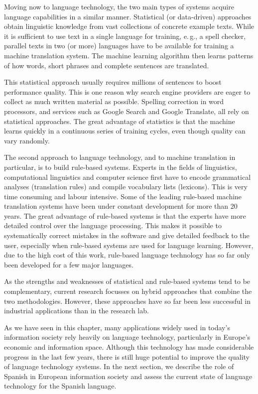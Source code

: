 \begin{multicols}{2}
Moving now to language technology, the two main types of systems acquire language capabilities in a similar manner. Statistical (or data-driven) approaches obtain linguistic knowledge from vast collections of concrete example texts. While it is sufficient to use text in a single language for training, e.\,g., a spell checker, parallel texts in two (or more) languages have to be available for training a machine translation system. The machine learning algorithm then learns patterns of how words, short phrases and complete sentences are translated. 

This statistical approach usually requires millions of sentences to boost performance quality. This is one reason why search engine providers are eager to collect as much written material as possible. Spelling correction in word processors, and services such as Google Search and Google Translate, all rely on statistical approaches. The great advantage of statistics is that the machine learns quickly in a continuous series of training cycles, even though quality can vary randomly.

The second approach to language technology, and to machine translation in particular, is to build rule-based systems. Experts in the fields of linguistics, computational linguistics and computer science first have to encode grammatical analyses (translation rules) and compile vocabulary lists (lexicons). This is very time consuming and labour intensive. Some of the leading rule-based machine translation systems have been under constant development for more than 20 years. The great advantage of rule-based systems is that the experts have more detailed control over the language processing. This makes it possible to systematically correct mistakes in the software and give detailed feedback to the user, especially when rule-based systems are used for language learning. However, due to the high cost of this work, rule-based language technology has so far only been developed for a few major languages. 


As the strengths and weaknesses of statistical and rule-based systems tend to be complementary, current research focusses on hybrid approaches that combine the two methodologies. However, these approaches have so far been less successful in industrial applications than in the research lab. 

As we have seen in this chapter, many applications widely used in today’s information society rely heavily on language technology, particularly in Europe’s economic and information space. Although this technology has made considerable progress in the last few years, there is still huge potential to improve the quality of language technology systems. In the next section, we describe the role of Spanish in European information society and assess the current state of language technology for the Spanish language.
\end{multicols}

